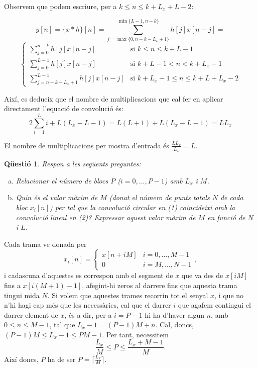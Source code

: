 \documentclass[11pt,a4]{article}
\numberwithin{equation}{section}
\theoremstyle{thmstyle}
\theoremstyle{thmstyle}
\theoremstyle{thmstyle}
\theoremstyle{thmstyle}
\theoremstyle{thmstyle}
\theoremstyle{thmstyle}
\newtheorem{question}{Qüestió}
\theoremstyle{thmstyle}
\begin{document}
Observem que podem escriure, per a $k\leqslant n \leq k+L_x+L-2$:

$$
y[n]=\lbrace x\ast h\rbrace[n]=\sum_{j=\max{\lbrace 0, n-k-L_x+1\rbrace}}^{\min{\lbrace L-1,n-k\rbrace}} h[j]x[n-j] = 
$$
$$
\begin{cases}
\sum_{j=0}^{n-k} h[j]x[n-j]  & \text{si $k \leqslant n \leqslant k + L - 1$} \\
\sum_{j=0}^{L-1} h[j]x[n-j]  & \text{si $k+L-1 < n < k + L_x - 1$} \\
\sum_{j=n-k-L_x+1}^{L-1} h[j]x[n-j]  & \text{si $k + L_x - 1 \leqslant n \leqslant k + L + L_x - 2$}
\end{cases}
$$

Així, es dedueix que el nombre de multiplicacions que cal fer en aplicar directament l'equació de convolució és:
$$
2\sum_{i=1}^{L} i + L(L_x - L - 1) = L(L+1)+L(L_x-L-1)=LL_x
$$

El nombre de multiplicacions per mostra d'entrada és $\frac{LL_x}{L_x}=L$.

\begin{question}
Respon a les següents preguntes:
\begin{enumerate}[a)]
\item Relacionar el número de blocs $P$ ($i=0,...,P-1$) amb $L_x$ i $M$.
\item Quin és el valor màxim de $M$ (donat el número de punts totals $N$ de cada bloc $x_i[n]$) per tal que la convolució circular en (1) coincideixi amb la convolució lineal en (2)?
Expressar aquest valor màxim de $M$ en funció de $N$ i $L$.
\end{enumerate}
\end{question}

Cada trama ve donada per
$$
x_i[n] =
\begin{cases}
x[n + iM] & i = 0,\ldots,M - 1 \\
0         & i = M, \ldots, N - 1
\end{cases},
$$
i cadascuna d'aquestes es correspon amb el segment de $x$ que va des de $x[iM]$ fins a $x[i(M + 1) - 1]$, afegint-hi zeros al darrere fins que aquesta trama tingui mida $N$. Si volem que aquestes trames recorrin tot el senyal $x$, i que no n'hi hagi cap més que les necessàries, cal que el darrer $i$ que agafem contingui el darrer element de $x$, és a dir, per a $i = P - 1$ hi ha d'haver algun $n$, amb $0 \leq n \leq M - 1$, tal que $L_x - 1 = (P-1)M + n$. Cal, doncs, $(P-1)M\leqslant L_x - 1 \leqslant PM - 1$. Per tant, necessitem
$$
\frac{L_x}{M}\leqslant P \leqslant \frac{L_x + M - 1}{M}.
$$
Així doncs, $P$ ha de ser $P = \big\lceil\frac{L_x}{M}\big\rceil$.
\end{document}
